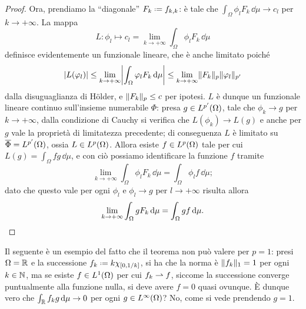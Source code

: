 \begin{proof}
    Ora, prendiamo la ``diagonale'' $F_k\defeq f_{k,k}$: è tale che $\int_\Omega\phi_lF_k\,\dd\mu\to c_l$ per $k\to+\infty$.
    La mappa
    \begin{equation}
        L\colon \phi_l\mapsto c_l=\lim_{k\to+\infty}\int_\Omega \phi_lF_k\,\dd\mu
    \end{equation}
    definisce evidentemente un funzionale lineare, che è anche limitato poich\'e
    \begin{equation}
        \abs{L(\phi_l)}\le
        \lim_{k\to+\infty}\abs[\bigg]{\int_\Omega \phi_lF_k\,\dd\mu}\le
        \lim_{k\to+\infty}\norm{F_k}_p\norm{\phi_l}_{p'}
    \end{equation}
    dalla disuguaglianza di Hölder, e $\norm{F_k}_p\le c$ per ipotesi.
    $L$ è dunque un funzionale lineare continuo sull'insieme numerabile $\Phi$: presa $g\in\leb[p']{\Omega}$, tale che $\phi_k\to g$ per $k\to+\infty$, dalla condizione di Cauchy si verifica che $L(\phi_k)\to L(g)$ e anche per $g$ vale la proprietà di limitatezza precedente; di conseguenza $L$ è limitato su $\clos{\Phi}=\leb[p']{\Omega}$, ossia $L\in\leb[p]{\Omega}$.
    Allora esiste $f\in\leb[p]{\Omega}$ tale per cui $L(g)=\int_\Omega fg\,\dd\mu$, e con ciò possiamo identificare la funzione $f$ tramite
    \begin{equation}
        \lim_{k\to+\infty}\int_\Omega \phi_lF_k\,\dd\mu=\int_\Omega \phi_lf\,\dd\mu;
    \end{equation}
    dato che questo vale per ogni $\phi_l$ e $\phi_l\to g$ per $l\to+\infty$ risulta allora
    \begin{equation}
        \lim_{k\to+\infty}\int_\Omega gF_k\,\dd\mu=\int_\Omega gf\,\dd\mu.\qedhere
    \end{equation}
\end{proof}
Il seguente è un esempio del fatto che il teorema non può valere per $p=1$: presi $\Omega=\R$ e la successione $f_k\defeq k\chi_{[0,1/k]}$, si ha che la norma è $\norm{f_k}_1=1$ per ogni $k\in\N$, ma se esiste $f\in\leb[1]{\Omega}$ per cui $f_k\weakto f$, siccome la successione converge puntualmente alla funzione nulla, si deve avere $f=0$ quasi ovunque.
È dunque vero che $\int_{\R}f_kg\,\dd\mu\to 0$ per ogni $g\in\leb[\infty]{\Omega}$?
No, come si vede prendendo $g=1$.
